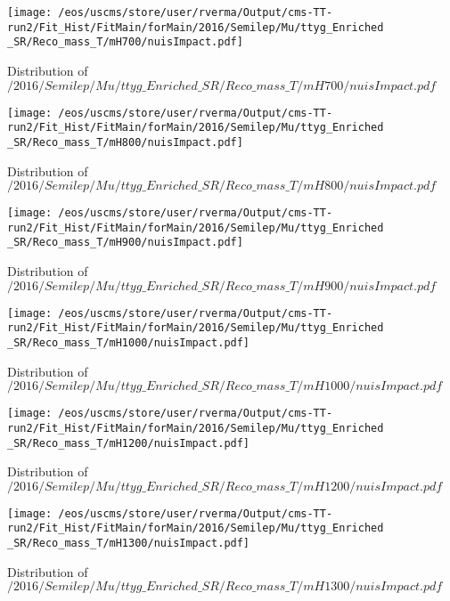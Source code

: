 \begin{figure}
\centering
\texttt{[image: /eos/uscms/store/user/rverma/Output/cms-TT-run2/Fit\_Hist/FitMain/forMain/2016/Semilep/Mu/ttyg\_Enriched\_SR/Reco\_mass\_T/mH700/nuisImpact.pdf]}
\caption{Distribution of $/2016/Semilep/Mu/ttyg\_Enriched\_SR/Reco\_mass\_T/mH700/nuisImpact.pdf$}
\end{figure}

\begin{figure}
\centering
\texttt{[image: /eos/uscms/store/user/rverma/Output/cms-TT-run2/Fit\_Hist/FitMain/forMain/2016/Semilep/Mu/ttyg\_Enriched\_SR/Reco\_mass\_T/mH800/nuisImpact.pdf]}
\caption{Distribution of $/2016/Semilep/Mu/ttyg\_Enriched\_SR/Reco\_mass\_T/mH800/nuisImpact.pdf$}
\end{figure}

\begin{figure}
\centering
\texttt{[image: /eos/uscms/store/user/rverma/Output/cms-TT-run2/Fit\_Hist/FitMain/forMain/2016/Semilep/Mu/ttyg\_Enriched\_SR/Reco\_mass\_T/mH900/nuisImpact.pdf]}
\caption{Distribution of $/2016/Semilep/Mu/ttyg\_Enriched\_SR/Reco\_mass\_T/mH900/nuisImpact.pdf$}
\end{figure}

\begin{figure}
\centering
\texttt{[image: /eos/uscms/store/user/rverma/Output/cms-TT-run2/Fit\_Hist/FitMain/forMain/2016/Semilep/Mu/ttyg\_Enriched\_SR/Reco\_mass\_T/mH1000/nuisImpact.pdf]}
\caption{Distribution of $/2016/Semilep/Mu/ttyg\_Enriched\_SR/Reco\_mass\_T/mH1000/nuisImpact.pdf$}
\end{figure}

\begin{figure}
\centering
\texttt{[image: /eos/uscms/store/user/rverma/Output/cms-TT-run2/Fit\_Hist/FitMain/forMain/2016/Semilep/Mu/ttyg\_Enriched\_SR/Reco\_mass\_T/mH1200/nuisImpact.pdf]}
\caption{Distribution of $/2016/Semilep/Mu/ttyg\_Enriched\_SR/Reco\_mass\_T/mH1200/nuisImpact.pdf$}
\end{figure}

\begin{figure}
\centering
\texttt{[image: /eos/uscms/store/user/rverma/Output/cms-TT-run2/Fit\_Hist/FitMain/forMain/2016/Semilep/Mu/ttyg\_Enriched\_SR/Reco\_mass\_T/mH1300/nuisImpact.pdf]}
\caption{Distribution of $/2016/Semilep/Mu/ttyg\_Enriched\_SR/Reco\_mass\_T/mH1300/nuisImpact.pdf$}
\end{figure}

